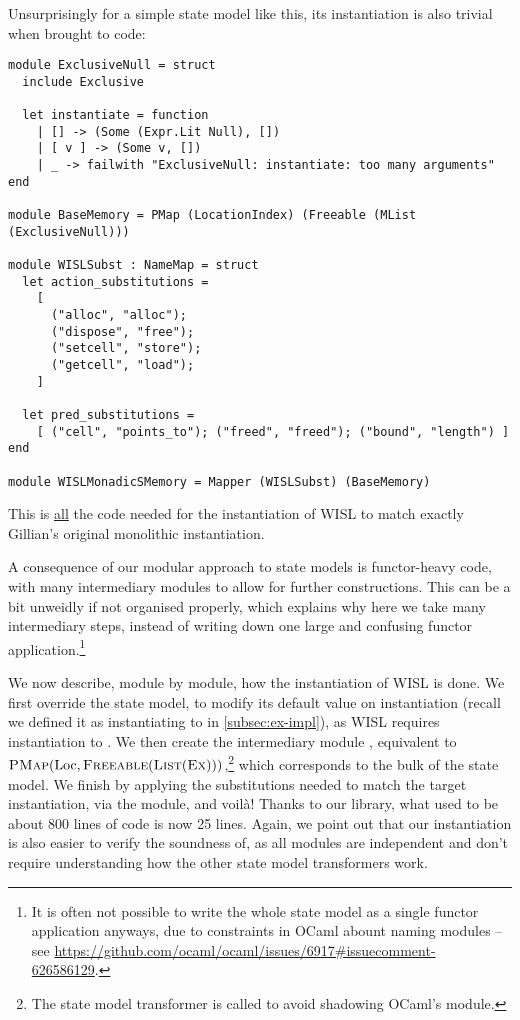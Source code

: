 Unsurprisingly for a simple state model like this, its instantiation is also trivial when brought to code: \begin{lstlisting}
module ExclusiveNull = struct
  include Exclusive

  let instantiate = function
    | [] -> (Some (Expr.Lit Null), [])
    | [ v ] -> (Some v, [])
    | _ -> failwith "ExclusiveNull: instantiate: too many arguments"
end

module BaseMemory = PMap (LocationIndex) (Freeable (MList (ExclusiveNull)))

module WISLSubst : NameMap = struct
  let action_substitutions =
    [
      ("alloc", "alloc");
      ("dispose", "free");
      ("setcell", "store");
      ("getcell", "load");
    ]

  let pred_substitutions =
    [ ("cell", "points_to"); ("freed", "freed"); ("bound", "length") ]
end

module WISLMonadicSMemory = Mapper (WISLSubst) (BaseMemory)
\end{lstlisting}
This is \underline{all} the code needed for the instantiation of WISL to match exactly Gillian's original monolithic instantiation.

A consequence of our modular approach to state models is functor-heavy code, with many intermediary modules to allow for further constructions. This can be a bit unweidly if not organised properly, which explains why here we take many intermediary steps, instead of writing down one large and confusing functor application.\footnote{It is often not possible to write the whole state model as a single functor application anyways, due to constraints in OCaml abount naming modules -- see \url{https://github.com/ocaml/ocaml/issues/6917\#issuecomment-626586129}.}

We now describe, module by module, how the instantiation of WISL is done. We first override the \Ex{} state model, to modify its default value on instantiation (recall we defined it as instantiating to  in \cref{subsec:ex-impl}), as WISL requires instantiation to . We then create the intermediary module , equivalent to $\textsc{PMap}(\text{Loc},\textsc{Freeable}(\textsc{List}(\textsc{Ex})))$,\footnote{The \List{} state model transformer is called  to avoid shadowing OCaml's  module.} which corresponds to the bulk of the state model. We finish by applying the substitutions needed to match the target instantiation, via the  module, and voilà! Thanks to our library, what used to be about 800 lines of code is now 25 lines. Again, we point out that our instantiation is also easier to verify the soundness of, as all modules are independent and don't require understanding how the other state model transformers work.

